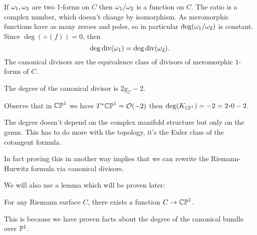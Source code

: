\documentclass[12pt]{memoir}
\begin{document}
If $\omega_1,\omega_2$ are two 1-forms on $C$ then $\omega_1/\omega_2$ is a function on $C$. The ratio is a complex number, which doesn't change by isomorphism. As meromorphic functions have as many zeroes and poles, so in particular $\deg(\omega_1/\omega_2)$ is constant. Since $\deg(\div(f))=0$, then 
$$\deg\operatorname{div}(\omega_1)=\deg\operatorname{div}(\omega_2).$$
The canonical divisors are the equivalence class of divisors of meromorphic $1$-forms of $C$.

\begin{Th}
    The degree of the canonical divisor is $2g_C-2$.
\end{Th}

\begin{Ex}
    Observe that in $\mathbb{CP}^1$ we have $T^\ast \mathbb{CP}^1=\mathcal{O}(-2)$ then $\deg(K_{\bCP^1})=-2=2\.0-2$.
\end{Ex}

The degree doesn't depend on the complex manifold structure but only on the genus. This has to do more with the topology, it's the Euler class of the cotangent formula.\par
In fact proving this in another way implies that we can rewrite the Riemann-Hurwitz formula via canonical divisors.\par
We will also use a lemma which will be proven later:

\begin{Lem}
    For any Riemann surface $C$, there exists a function $C\to\mathbb{CP}^1$.
\end{Lem}

This is because we have proven facts about the degree of the canonical bundle over $\mathbb{P}^1$.
\end{document}
